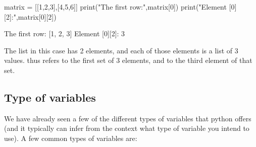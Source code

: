 \begin{python}[caption = \mbox{}]
matrix = [[1,2,3],[4,5,6]]
print("The first row:",matrix[0])
print("Element [0][2]:",matrix[0][2])
\end{python}
\begin{poutput}
The first row: [1, 2, 3]
Element [0][2]: 3
\end{poutput}
The  list in this case has 2 elements, and each of those elements is a list of 3 values.  thus refers to the first set of 3 elements, and  to the third element of that set. 

\subsection{Type of variables}
We have already seen a few of the different types of variables that python offers (and it typically can infer from the context what type of variable you intend to use). A few common types of variables are:
